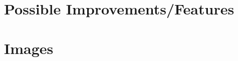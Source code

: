\documentclass[12pt]{article}
\begin{document}
\section{Possible Improvements/Features}

\section{Images}

\end{document}
